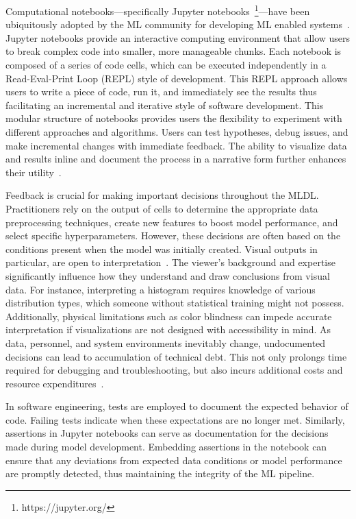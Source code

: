 Computational notebooks---specifically Jupyter notebooks~\footnote{https://jupyter.org/}---have been ubiquitously adopted by the ML community for developing ML enabled systems~\cite{pimentel2019large-scale,quaranta2021kgtorrent,psallidas2019data,perkel2018why}. Jupyter notebooks provide an interactive computing environment that allow users to break complex code into smaller, more manageable chunks. Each notebook is composed of a series of code cells, which can be executed independently in a Read-Eval-Print Loop (REPL) style of development. This REPL approach allows users to write a piece of code, run it, and immediately see the results thus facilitating an incremental and iterative style of software development. This modular structure of notebooks provides users the flexibility to experiment with different approaches and algorithms. Users can test hypotheses, debug issues, and make incremental changes with immediate feedback. The ability to visualize data and results inline and document the process in a narrative form further enhances their utility~\cite{kery2018story,head2019managing,rule2018exploration,chattopadhyay2020whats}.

Feedback is crucial for making important decisions throughout the MLDL. Practitioners rely on the output of cells to determine the appropriate data preprocessing techniques, create new features to boost model performance, and select specific hyperparameters. However, these decisions are often based on the conditions present when the model was initially created. Visual outputs in particular, are open to interpretation~\cite{heer2010tour}. The viewer's background and expertise significantly influence how they understand and draw conclusions from visual data. 
For instance, interpreting a histogram requires knowledge of various distribution types, which someone without statistical training might not possess. Additionally, physical limitations such as color blindness can impede accurate interpretation if visualizations are not designed with accessibility in mind. As data, personnel, and system environments inevitably change, undocumented decisions can lead to accumulation of technical debt. This not only prolongs time required for debugging and troubleshooting, but also incurs additional costs and resource expenditures~\cite{sculley2015hidden,amershi2019software,sambasivan2021everyone}.

In software engineering, tests are employed to document the expected behavior of code. Failing tests indicate when these expectations are no longer met. Similarly, assertions in Jupyter notebooks can serve as documentation for the decisions made during model development. Embedding assertions in the notebook can ensure that any deviations from expected data conditions or model performance are promptly detected, thus maintaining the integrity of the ML pipeline.

